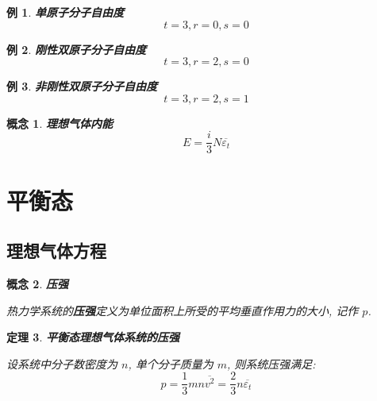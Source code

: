 \documentclass[UTF8]{ctexart}
\newcommand{\<}{\langle}
\renewcommand{\>}{\rangle}                              %
\newenvironment{dfn_box}{
    \begin{tcolorbox}[enhanced, colback=dfn_green2, boxrule=0pt, frame hidden,
        borderline west={0.7mm}{0.1mm}{dfn_green1},breakable]
    }
    {\end{tcolorbox}}
\newenvironment{thm_box}{
    \begin{tcolorbox}[enhanced, colback=thm_blue2, boxrule=0pt, frame hidden,
        borderline west={0.7mm}{0.1mm}{thm_blue1},breakable]
    }
    {\end{tcolorbox}}
\newenvironment{xmp_box}{
    \begin{tcolorbox}[enhanced, colback=xmp_purple2, boxrule=0pt, frame hidden,
        borderline west={0.7mm}{0.1mm}{xmp_purple1},breakable]
    }
    {\end{tcolorbox}}
\theoremstyle{MyStyle} %
\newtheorem{definition}{概念}[subsection]
\newenvironment{cpt}{\begin{dfn_box}\begin{definition}}{\end{definition}\end{dfn_box}}
\newtheorem{theorem}[definition]{定理}
\newenvironment{thm}{\begin{thm_box}\begin{theorem}}{\end{theorem}\end{thm_box}}
\newtheorem{example}{例}[definition]
\newenvironment{xmp}{\begin{xmp_box}\begin{example}}{\end{example}\end{xmp_box}}
\begin{document}
        \begin{xmp}
            \textbf{单原子分子自由度}
            \[t=3, r=0, s=0\]
        \end{xmp}

        \begin{xmp}
            \textbf{刚性双原子分子自由度}
            \[t=3, r=2, s=0\]
        \end{xmp}

        \begin{xmp}
            \textbf{非刚性双原子分子自由度}
            \[t=3, r=2, s=1\]
        \end{xmp}
        
        \begin{cpt}
            \textbf{理想气体内能}
            \[E=\frac{i}{3}N\overline{\varepsilon_t}\]
        \end{cpt}
    
\section{平衡态}

    \subsection{理想气体方程}

        \begin{cpt}
            \textbf{压强}

            热力学系统的\textbf{压强}定义为单位面积上所受的平均垂直作用力的大小, 记作 \(p\). 
        \end{cpt}
        
        \begin{thm}
            \textbf{平衡态理想气体系统的压强}

            设系统中分子数密度为 \(n\), 单个分子质量为 \(m\), 则系统压强满足: 
            \[p=\frac{1}{3}mn\overline{v^2}=\frac{2}{3}n\overline{\varepsilon_t}\]
        \end{thm}
        
\end{document}
